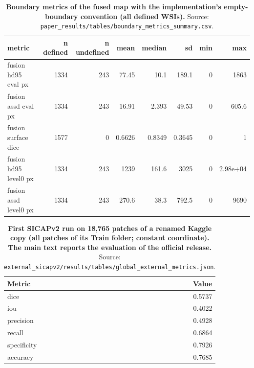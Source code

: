 \documentclass[10pt]{article}
\begin{document}
\begin{table}[H]\centering\footnotesize
\caption{\textbf{Boundary metrics of the fused map with the implementation's empty-boundary convention (all defined WSIs).} Source: \texttt{paper\_results/tables/boundary\_metrics\_summary.csv}.}
\begin{tabular}{lrrrrrrr}\toprule
metric & n defined & n undefined & mean & median & sd & min & max\\\midrule
fusion hd95 eval px & 1334 & 243 & 77.45 & 10.1 & 189.1 & 0 & 1863\\
fusion assd eval px & 1334 & 243 & 16.91 & 2.393 & 49.53 & 0 & 605.6\\
fusion surface dice & 1577 & 0 & 0.6626 & 0.8349 & 0.3645 & 0 & 1\\
fusion hd95 level0 px & 1334 & 243 & 1239 & 161.6 & 3025 & 0 & 2.98e+04\\
fusion assd level0 px & 1334 & 243 & 270.6 & 38.3 & 792.5 & 0 & 9690\\
\bottomrule\end{tabular}\end{table}

\begin{table}[H]\centering\footnotesize
\caption{\textbf{First SICAPv2 run on 18,765 patches of a renamed Kaggle copy (all patches of its Train folder; constant coordinate). The main text reports the evaluation of the official release.} Source: \texttt{external\_sicapv2/results/tables/global\_external\_metrics.json}.}
\begin{tabular}{lr}\toprule
Metric & Value\\\midrule
dice & 0.5737\\
iou & 0.4022\\
precision & 0.4928\\
recall & 0.6864\\
specificity & 0.7926\\
accuracy & 0.7685\\
\bottomrule\end{tabular}\end{table}
\end{document}

